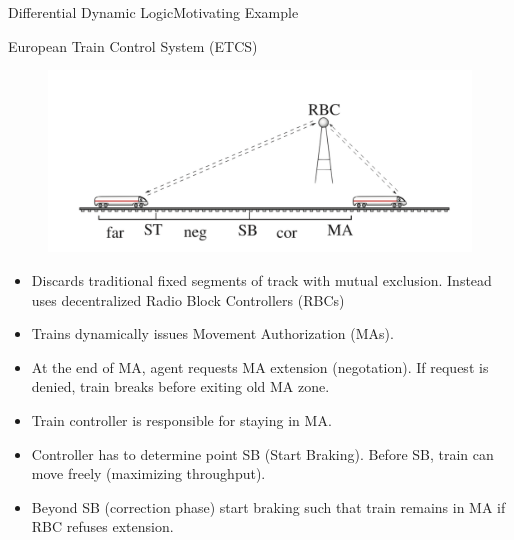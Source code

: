 \documentclass{beamer}
\begin{document}
\begin{frame}{Differential Dynamic Logic}{Motivating Example}
  \begin{block}{European Train Control System (ETCS)}
    \begin{figure}
      \centering
      \includegraphics[scale=0.3]{etcs}
    \end{figure}
  \begin{itemize}
    \item <only@1> Discards traditional fixed segments of track with mutual
      exclusion. Instead uses decentralized Radio Block Controllers (RBCs)
    \item <only@1> Trains dynamically issues Movement Authorization (MAs).
    \item <only@1> At the end of MA, agent requests MA extension (negotation).
      If request is denied, train breaks before exiting old MA
      zone.
     \item <only@2> Train controller is responsible for staying in MA.
     \item <only@2> Controller has to determine point SB (Start Braking). Before SB,
      train can move freely (maximizing throughput).
    \item <only@2> Beyond SB (correction phase) start braking such that
      train remains in MA if RBC refuses extension.
  \end{itemize}
  \end{block}
  \end{frame}
\end{document}
